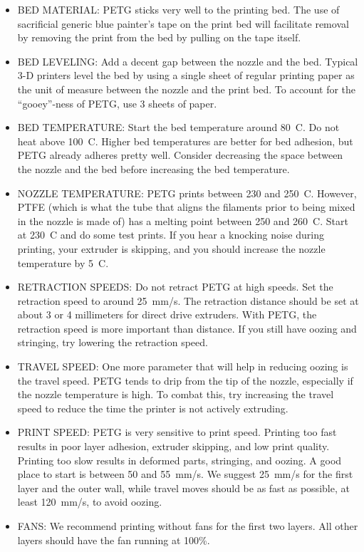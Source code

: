 \begin{itemize}
    \item BED MATERIAL: \ac{PETG} sticks very well to the printing bed. The use of sacrificial generic blue painter's tape on the print bed will facilitate removal by removing the print from the bed by pulling on the tape itself.
    \item BED LEVELING: Add a decent gap between the nozzle and the bed. Typical 3-D printers level the bed by using a single sheet of regular printing paper as the unit of measure between the nozzle and the print bed. To account for the ``gooey''-ness of \ac{PETG}, use 3 sheets of paper.
    \item BED TEMPERATURE: Start the bed temperature around 80\textdegree~C. Do not heat above 100\textdegree~C. Higher bed temperatures are better for bed adhesion, but \ac{PETG} already adheres pretty well. Consider decreasing the space between the nozzle and the bed before increasing the bed temperature. 
    \item NOZZLE TEMPERATURE: \ac{PETG} prints between 230 and 250\textdegree~C. However, \ac{PTFE} (which is what the tube that aligns the filaments prior to being mixed in the nozzle is made of) has a melting point between 250 and 260\textdegree~C. Start at 230\textdegree~C and do some test prints. If you hear a knocking noise during printing, your extruder is skipping, and you should increase the nozzle temperature by 5\textdegree~C. 
    \item RETRACTION SPEEDS: Do not retract \ac{PETG} at high speeds. Set the retraction speed to around 25~mm/s. The retraction distance should be set at about 3 or 4 millimeters for direct drive extruders. With \ac{PETG}, the retraction speed is more important than distance. If you still have oozing and stringing, try lowering the retraction speed.
    \item TRAVEL SPEED: One more parameter that will help in reducing oozing is the travel speed. \ac{PETG} tends to drip from the tip of the nozzle, especially if the nozzle temperature is high. To combat this, try increasing the travel speed to reduce the time the printer is not actively extruding.
    \item PRINT SPEED: \ac{PETG} is very sensitive to print speed. Printing too fast results in poor layer adhesion, extruder skipping, and low print quality. Printing too slow results in deformed parts, stringing, and oozing. A good place to start is between 50 and 55~mm/s. We suggest 25~mm/s for the first layer and the outer wall, while travel moves should be as fast as possible, at least 120~mm/s, to avoid oozing.
    \item FANS: We recommend printing without fans for the first two layers. All other layers should have the fan running at 100\%. 
\end{itemize}


